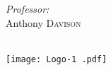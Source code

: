 \begin{titlepage}
\begin{minipage}{0.4\textwidth}
\begin{flushright}
    \emph{Professor:} \\
    Anthony \textsc{Davison}\\
    \end{flushright}
    \end{minipage}\\[10cm]
    
    
    
    \texttt{[image: Logo-1 .pdf]}\\[1cm] 
     
    
    \vfill %
    
    \end{titlepage}